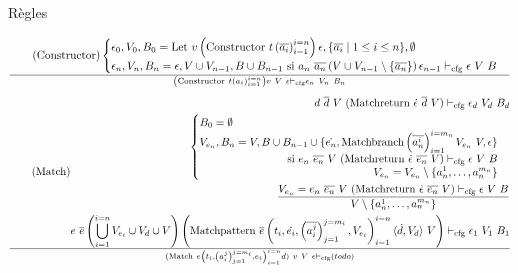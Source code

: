 \documentclass{beamer}
\begin{document}
\begin{frame}{Règles}
\begin{gather}
     \end{gather}
     \begin{gather}
        \tag{Constructor}
        \begin{cases}
           \epsilon_0, V_0, B_0 = \text{Let} ~ v \left( \text{Constructor} ~ t \left( \overline{a_i} \right)_{i=1}^{i=n} \right) \epsilon, \lbrace \overline{a_i} \mid 1 \leq i \leq n \rbrace, \emptyset \\
           \epsilon_n, V_n, B_n = \epsilon, V \cup V_{n-1}, B \cup B_{n-1} \text{ si } a_n ~ \overline{a_n} \left( V \cup V_{n-1} \setminus \lbrace \overline{a_n} \rbrace \right) \epsilon_{n-1} \vdash_{\text{cfg}} \epsilon ~ V ~ B \\
        \end{cases}
        \over \left( \text{Constructor} ~ t \left( a_i \right)_{i=1}^{i=n} \right) v ~ V ~ \epsilon \vdash_{\text{cfg}} \epsilon_n ~ V_n ~ B_n
     \end{gather}
     \begin{gather}
        \tag{Match}
        \begin{split}
           d ~ \overline{d} ~ V ~ (\text{Matchreturn} ~ \dot{\epsilon} ~ \overline{d} ~ V) \vdash_{\text{cfg}} \epsilon_d ~ V_d ~ B_d \\
           \begin{cases}
              B_0 = \emptyset \\
              \begin{split}
              V_{e_n}, B_n = V, B \cup B_{n-1} \cup \lbrace \dot{e_n}, \text{Matchbranch} \left( \overline{a_n^i} \right)_{i=1}^{i=m_n} V_{e_n} ~ V, \epsilon \rbrace \\ \text{ si } e_n ~ \overline{e_n} ~ V ~ (\text{Matchreturn} ~ \dot{\epsilon} ~ \overline{e_n} ~ V) \vdash_{\text{cfg}} \epsilon ~ V ~ B \\
              V_{e_n} = V_{e_n} \setminus \lbrace a_n^1, \dots, a_n^{m_n} \rbrace
              \end{split}
           \end{cases} \\
           { V_{e_n} =
           e_n ~ \overline{e_n} ~ V ~ (\text{Matchreturn} ~ \dot{\epsilon} ~ \overline{e_n} ~ V) \vdash_{\text{cfg}} \epsilon ~ V ~ B
           \over V \setminus \lbrace a_n^1, \dots, a_n^{m_n} \rbrace } \\
           e ~ \overline{e} \left( \bigcup_{i=1}^{i=n} V_{e_i} \cup V_d \cup V \right) \left( \text{Matchpattern} ~ \overline{e} \left( t_i, \dot{e_i}, \left( \overline{a_i^j} \right)_{j=1}^{j=m_i}, V_{e_i} \right)_{i=1}^{i=n} \langle \dot{d}, V_d \rangle ~ V \right) \vdash_{\text{cfg}} \epsilon_1 ~ V_1 ~ B_1
        \end{split}
        \over (\text{Match} ~ e \left( t_i, \left( a_i^j \right)_{j=1}^{j=m_i}, e_i \right)_{i=1}^{i=n} d) ~ v ~ V ~ \epsilon \vdash_{\text{cfg}} (todo)
     \end{gather}
\end{frame}
\fi
\end{document}
